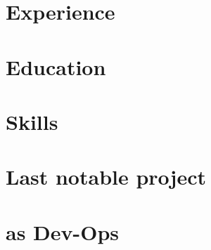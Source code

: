 \def\sitepage{tooling}
\section{Experience}





\section{Education}







\clearpage



\section{Skills}
\begin{cvcolumns}
  
  
  
\end{cvcolumns}


\section{Last notable project}




\section{\textmd{as} Dev-Ops}

